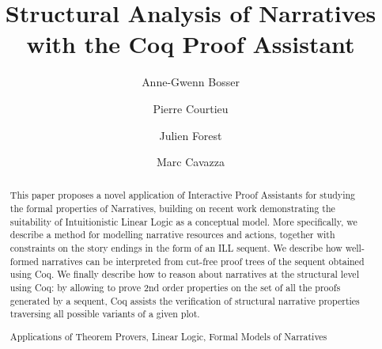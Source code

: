 \documentclass[runningheads,a4paper]{llncs}
\newcommand{\keywords}[1]{\par\addvspace\baselineskip
\noindent\keywordname\enspace\ignorespaces#1}
\begin{document}
\mainmatter  %

\title{Structural Analysis of Narratives with the Coq Proof Assistant}

%
%
\author{Anne-Gwenn Bosser%
\and Pierre Courtieu\and Julien Forest \and Marc Cavazza}
%


%
%

\maketitle
\begin{abstract}
This paper proposes a novel application of Interactive Proof Assistants for studying the formal properties of Narratives, building on recent work demonstrating the suitability of Intuitionistic Linear Logic as a conceptual model. 
More specifically, we describe a method for modelling narrative resources and actions, together with constraints on the story endings in the form of an ILL sequent. We describe how well-formed narratives can be interpreted from cut-free proof trees of the sequent obtained using Coq. We finally describe how to reason about narratives at the structural level using Coq: by allowing to prove 2nd order properties on the set of all the proofs generated by a sequent, Coq assists the verification of structural narrative properties traversing all possible variants of a given plot.
\keywords{Applications of Theorem Provers, Linear Logic, Formal Models of Narratives}
\end{abstract}
\end{document}

